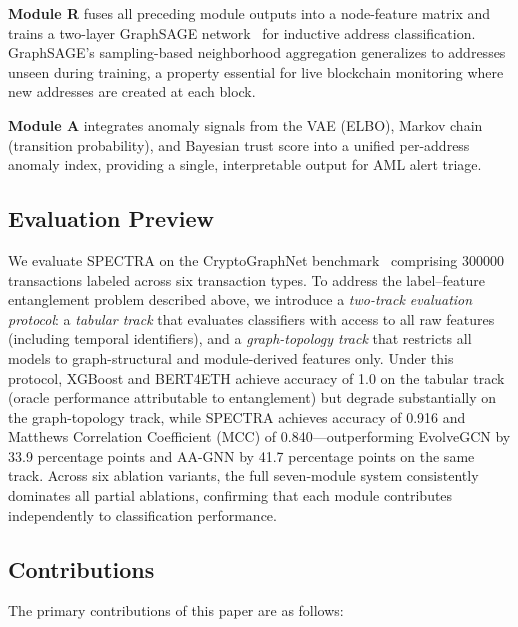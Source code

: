 \documentclass[journal]{IEEEtran}
\begin{document}
\textbf{Module R} fuses all preceding module outputs into a node-feature
matrix and trains a two-layer GraphSAGE network~\cite{Hamilton2017} for
inductive address classification.
GraphSAGE's sampling-based neighborhood aggregation generalizes to addresses
unseen during training, a property essential for live blockchain monitoring
where new addresses are created at each block.

\textbf{Module A} integrates anomaly signals from the VAE (ELBO), Markov
chain (transition probability), and Bayesian trust score into a unified
per-address anomaly index, providing a single, interpretable output for
AML alert triage.

\subsection*{Evaluation Preview}

We evaluate SPECTRA on the CryptoGraphNet
benchmark~\cite{Farrugia2020} comprising \num{300000} transactions
labeled across six transaction types.
To address the label--feature entanglement problem described above, we
introduce a \emph{two-track evaluation protocol}: a \emph{tabular track}
that evaluates classifiers with access to all raw features (including temporal
identifiers), and a \emph{graph-topology track} that restricts all models
to graph-structural and module-derived features only.
Under this protocol, XGBoost and BERT4ETH achieve accuracy of \num{1.0} on
the tabular track (oracle performance attributable to entanglement) but
degrade substantially on the graph-topology track, while SPECTRA achieves
accuracy of \num{0.916} and Matthews Correlation Coefficient (MCC) of
\num{0.840}---outperforming EvolveGCN by \num{33.9} percentage points and
AA-GNN by \num{41.7} percentage points on the same track.
Across six ablation variants, the full seven-module system consistently
dominates all partial ablations, confirming that each module contributes
independently to classification performance.

\subsection*{Contributions}

The primary contributions of this paper are as follows:
\end{document}
